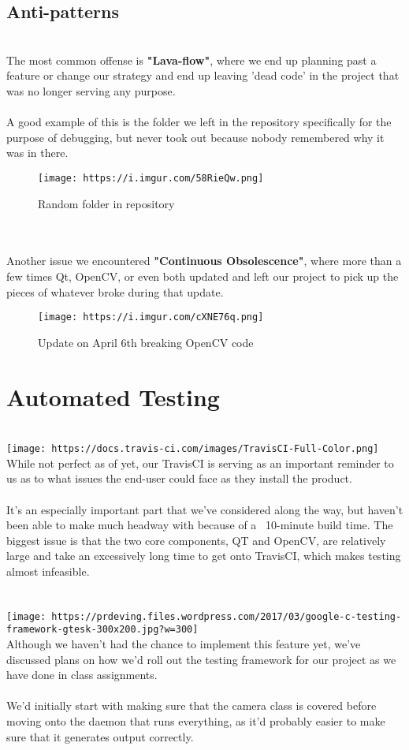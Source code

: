 \documentclass[12pt]{article}
\begin{document}
\subsection*{Anti-patterns}
\\The most common offense is \textbf{"Lava-flow"}, where we end up planning past a feature or change our strategy and end up leaving 'dead code' in the project that was no longer serving any purpose.
\\
\\A good example of this is the folder we left in the repository specifically for the purpose of debugging, but never took out because nobody remembered why it was in there.
\\\begin{figure}[h]
    \centering
    \texttt{[image: https://i.imgur.com/58RieQw.png]}
    \caption{Random folder in repository}
\end{figure}
\\
\\Another issue we encountered \textbf{"Continuous Obsolescence"}, where more than a few times Qt, OpenCV, or even both updated and left our project to pick up the pieces of whatever broke during that update.
\\\begin{figure}[width=0.25\textwidth]
    \centering
    \texttt{[image: https://i.imgur.com/cXNE76q.png]}
    \caption{Update on April 6th breaking OpenCV code}
\end{figure}
\pagebreak

\section*{Automated Testing}
\\\texttt{[image: https://docs.travis-ci.com/images/TravisCI-Full-Color.png]}
\\
While not perfect as of yet, our TravisCI is serving as an important reminder to us as to what issues the end-user could face as they install the product. 
\\
\\It's an especially important part that we've considered along the way, but haven't been able to make much headway with because of a ~10-minute build time. The biggest issue is that the two core components, QT and OpenCV, are relatively large and take an excessively long time to get onto TravisCI, which makes testing almost infeasible.
\\
\\
\\\texttt{[image: https://prdeving.files.wordpress.com/2017/03/google-c-testing-framework-gtesk-300x200.jpg?w=300]}
\\Although we haven't had the chance to implement this feature yet, we've discussed plans on how we'd roll out the testing framework for our project as we have done in class assignments. 
\\
\\We'd initially start with making sure that the camera class is covered before moving onto the daemon that runs everything, as it'd probably easier to make sure that it generates output correctly.
\pagebreak
\end{document}
